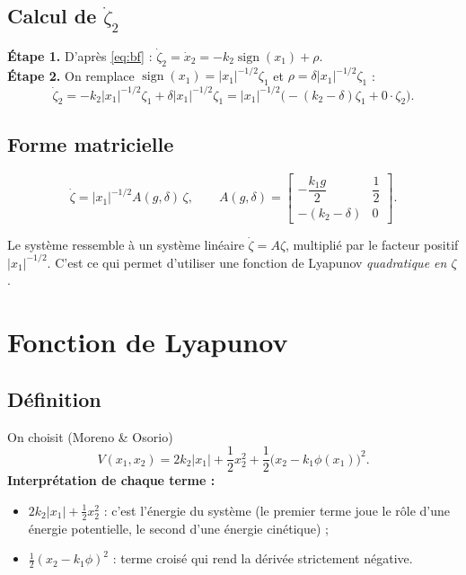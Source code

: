 \documentclass[11pt,a4paper]{article}
\numberwithin{equation}{section}
\theoremstyle{plain}
\theoremstyle{definition}
\theoremstyle{remark}
\newcommand{\sign}{\operatorname{sign}}
\begin{document}
\subsection{Calcul de $\dot\zeta_2$}
\textbf{Étape 1.} D'après \eqref{eq:bf} : $\dot\zeta_2 = \dot x_2 = -k_2\sign(x_1)+\rho$.\\
\textbf{Étape 2.} On remplace $\sign(x_1) = |x_1|^{-1/2}\zeta_1$ et $\rho=\delta|x_1|^{-1/2}\zeta_1$ :
\begin{equation}
\dot\zeta_2 = -k_2|x_1|^{-1/2}\zeta_1 + \delta|x_1|^{-1/2}\zeta_1 = |x_1|^{-1/2}\Big(-(k_2-\delta)\zeta_1 + 0\cdot\zeta_2\Big).
\end{equation}

\subsection{Forme matricielle}
\begin{resultat}
\begin{equation}\label{eq:zetadot}
\dot\zeta = |x_1|^{-1/2}A(g,\delta)\,\zeta,\qquad
A(g,\delta) = \begin{bmatrix}-\dfrac{k_1g}{2} & \dfrac12\\[8pt] -(k_2-\delta) & 0\end{bmatrix}.
\end{equation}
\end{resultat}
\begin{idee}
Le système \og ressemble\fg{} à un système linéaire $\dot\zeta = A\zeta$, multiplié par le facteur
positif $|x_1|^{-1/2}$. C'est ce qui permet d'utiliser une fonction de Lyapunov \emph{quadratique en $\zeta$}.
\end{idee}

\section{Fonction de Lyapunov}

\subsection{Définition}
On choisit (Moreno \& Osorio)
\begin{equation}\label{eq:V}
V(x_1,x_2) = 2k_2|x_1| + \frac12x_2^2 + \frac12\big(x_2-k_1\phi(x_1)\big)^2 .
\end{equation}
\textbf{Interprétation de chaque terme :}
\begin{itemize}
  \item $2k_2|x_1| + \frac12x_2^2$ : c'est \og l'énergie\fg{} du système (le premier terme joue le rôle d'une énergie
        potentielle, le second d'une énergie cinétique) ;
  \item $\frac12(x_2-k_1\phi)^2$ : terme croisé qui rend la dérivée strictement négative.
\end{itemize}
\end{document}
